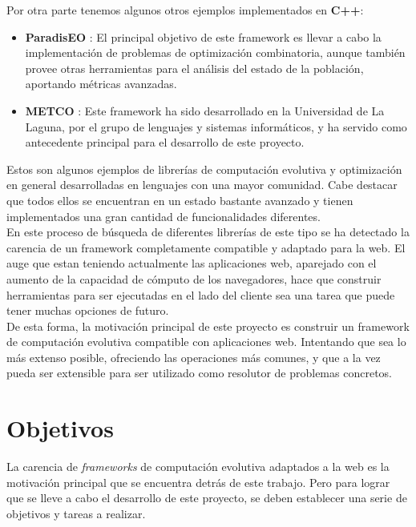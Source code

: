 Por otra parte tenemos algunos otros ejemplos implementados en \textbf{C++}:

\begin{itemize}
    \item \textbf{ParadisEO} \cite{cahon2004paradiseo}: El principal objetivo de este framework es llevar a cabo la implementación de problemas de optimización combinatoria, aunque también provee otras herramientas para el análisis del estado de la población, aportando métricas avanzadas.
    \item \textbf{METCO} \cite{leon2009metco}: Este framework ha sido desarrollado en la Universidad de La Laguna, por el grupo de lenguajes y sistemas informáticos, y ha servido como antecedente principal para el desarrollo de este proyecto.
\end{itemize}

Estos son algunos ejemplos de librerías de computación evolutiva y optimización en general desarrolladas en lenguajes con una mayor comunidad. Cabe destacar que todos ellos se encuentran en un estado bastante avanzado y tienen implementados una gran cantidad de funcionalidades diferentes. \\

En este proceso de búsqueda de diferentes librerías de este tipo se ha detectado la carencia de un framework completamente compatible y adaptado para la web. El auge que estan teniendo actualmente las aplicaciones web, aparejado con el aumento de la capacidad de cómputo de los navegadores, hace que construir herramientas para ser ejecutadas en el lado del cliente sea una tarea que puede tener muchas opciones de futuro. \\

De esta forma, la motivación principal de este proyecto es construir un framework de computación evolutiva compatible con aplicaciones web. Intentando que sea lo más extenso posible, ofreciendo las operaciones más comunes, y que a la vez pueda ser extensible para ser utilizado como resolutor de problemas concretos.

\section{Objetivos}
\label{1:sec:5}

La carencia de \textit{frameworks} de computación evolutiva adaptados a la web es la motivación principal que se encuentra detrás de este trabajo. Pero para lograr que se lleve a cabo el desarrollo de este proyecto, se deben establecer una serie de objetivos y tareas a realizar. \\

